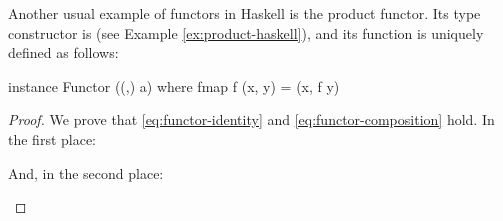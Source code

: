 \begin{example}
  \label{ex:functor-product-haskell}


  Another usual example of functors in Haskell is the product functor.
  Its type constructor is  (see Example
  \ref{ex:product-haskell}), and its  function is
  uniquely defined as follows:
  \begin{codehaskell}
instance Functor ((,) a) where
  fmap f (x, y) = (x, f y)
  \end{codehaskell}


  \begin{proof}

    We prove that \eqref{eq:functor-identity} and
    \eqref{eq:functor-composition} hold. In the first place:
    \begin{steps}
    \end{steps}
    And, in the second place:
    \begin{steps}
    \end{steps}

  \end{proof}

\end{example}

